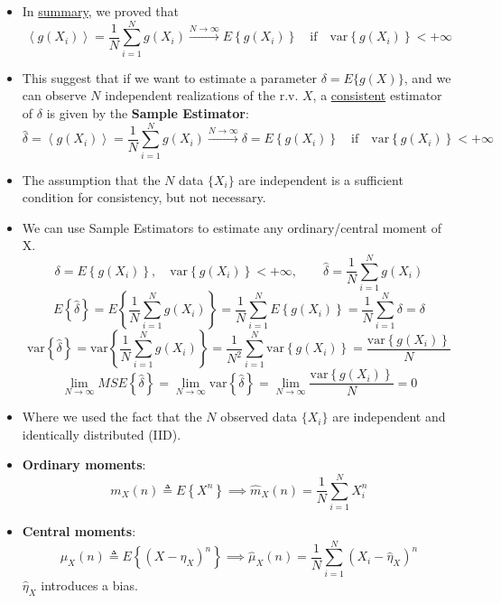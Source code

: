 \begin{itemize}
\noindent The unbiased estimator has higher MSE than the biased one, hence its less efficient.

\item In \underline{summary}, we proved that
\[
\left\langle g(X_i) \right\rangle = \frac{1}{N} \sum_{i=1}^{N} g(X_i)
\xrightarrow{N \to \infty}
E\left\{ g(X_i) \right\}
\quad \text{if} \quad \mathrm{var}\left\{ g(X_i) \right\} < +\infty
\]

\item This suggest that if we want to estimate a parameter \(\delta=E\{g(X)\}\), and we can observe \(N\) independent realizations of the r.v. \(X\), a \underline{consistent} estimator of \(\delta\) is given by the \textbf{Sample Estimator}:
\[
\hat{\delta} = \left\langle g(X_i) \right\rangle = \frac{1}{N} \sum_{i=1}^{N} g(X_i)
\xrightarrow{N \to \infty}
\delta = E\left\{ g(X_i) \right\}
\quad \text{if} \quad \mathrm{var} \left\{ g(X_i) \right\} < +\infty
\]
\item The assumption that the \(N\) data \(\{X_i\}\) are independent is a sufficient condition for consistency, but not necessary.

\item We can use Sample Estimators to estimate any ordinary/central moment of X.
\[
\delta = E\left\{ g(X_i) \right\}, \quad \mathrm{var}\left\{ g(X_i) \right\} < +\infty, \qquad \hat{\delta} = \frac{1}{N} \sum_{i=1}^{N} g(X_i)
\]
\[
E \left\{ \hat{\delta} \right\}
= E \left\{ \frac{1}{N} \sum_{i=1}^{N} g(X_i) \right\}
= \frac{1}{N} \sum_{i=1}^{N} E \left\{ g(X_i) \right\}
= \frac{1}{N} \sum_{i=1}^{N} \delta = \delta 
\]
\[
\mathrm{var}\left\{ \hat{\delta} \right\}
= \mathrm{var}\left\{ \frac{1}{N} \sum_{i=1}^{N} g(X_i) \right\}
= \frac{1}{N^2} \sum_{i=1}^{N} \mathrm{var}\left\{ g(X_i) \right\}
= \frac{\mathrm{var}\left\{ g(X_i) \right\}}{N} 
\]
\[
\lim_{N \to \infty} MSE\left\{ \hat{\delta} \right\}
= \lim_{N \to \infty} \mathrm{var}\left\{ \hat{\delta} \right\}
= \lim_{N \to \infty} \frac{\mathrm{var}\left\{ g(X_i) \right\}}{N} = 0
\]
\item Where we used the fact that the \(N\) observed data \(\{X_i\}\) are independent and identically distributed (IID).

\item \textbf{Ordinary moments}: 
\[
m_X(n) \triangleq E\left\{ X^n \right\}
\implies
\hat{m}_X(n) = \frac{1}{N} \sum_{i=1}^{N} X_i^n
\]
\item \textbf{Central moments}:
\[
\mu_X(n) \triangleq E \left\{ (X - \eta_X)^n \right\}
\implies
\hat{\mu}_X(n) = \frac{1}{N} \sum_{i=1}^{N} (X_i - \hat{\eta}_X)^n
\]
\noindent \(\hat{\eta}_X\) introduces a bias.


\end{itemize}

